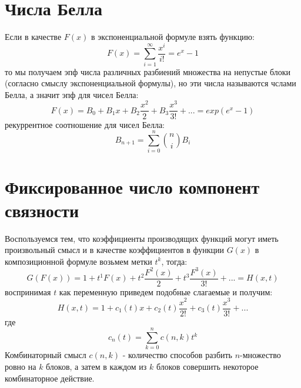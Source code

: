 \section{Числа Белла}

Если в качестве $F\left(x\right)$ в экспоненциальной формуле взять функцию:
\[
	F\left(x\right) = \sum_{i=1}^\infty \frac{x^i}{i!} = e^x - 1
\]
то мы получаем эпф числа различных разбиений множества на непустые блоки (согласно смыслу экспоненциальной формулы), но эти числа называются чслами Белла, а значит эпф для чисел Белла:
\begin{equation}
	F\left(x\right) = B_0 + B_1 x + B_2 \frac{x^2}{2} + B_3 \frac{x^3}{3!} + ... = exp\left(e^x - 1\right)
\end{equation}
рекуррентное соотношение для чисел Белла:
\begin{equation}
	B_{n+1} = \sum_{i=0}^n \binom{n}{i} B_i
\end{equation}

\section{Фиксированное число компонент связности}

Воспользуемся тем, что коэффициенты производящих функций могут иметь произвольный смысл и в качестве коэффициентов в функции $G\left(x\right)$ в композиционной формуле возьмем метки $t^k$, тогда:
\[
	G\left(F\left(x\right)\right) = 1+ t^1F\left(x\right) + t^2 \frac{F^2\left(x\right)}{2} + t^3 \frac{F^3\left(x\right)}{3!} + ... = H\left(x,t\right)
\]
воспринимая $t$ как переменную приведем подобные слагаемые и получим:
\[
	H\left(x,t\right) = 1 + c_1\left(t\right)x + c_2\left(t\right)\frac{x^2}{2!} + c_3\left(t\right)\frac{x^3}{3!} + ...
\]
где
\[
	c_n\left(t\right) = \sum_{k=0}^n c\left(n,k\right) t^k
\]
Комбинаторный смысл $c\left(n,k\right)$ - количество способов разбить $n$-множество ровно на $k$ блоков, а затем в каждом из $k$ блоков совершить некоторое комбинаторное действие.
